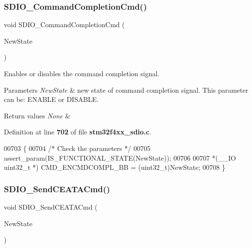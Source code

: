 \subsubsection{S\+D\+I\+O\+\_\+\+Command\+Completion\+Cmd()}
{\footnotesize\ttfamily void S\+D\+I\+O\+\_\+\+Command\+Completion\+Cmd (\begin{DoxyParamCaption}\item[{\textbf{ Functional\+State}}]{New\+State }\end{DoxyParamCaption})}



Enables or disables the command completion signal. 


\begin{DoxyParams}{Parameters}
{\em New\+State} & new state of command completion signal. This parameter can be\+: E\+N\+A\+B\+LE or D\+I\+S\+A\+B\+LE. \\
\hline
\end{DoxyParams}

\begin{DoxyRetVals}{Return values}
{\em None} & \\
\hline
\end{DoxyRetVals}


Definition at line \textbf{ 702} of file \textbf{ stm32f4xx\+\_\+sdio.\+c}.


\begin{DoxyCode}
00703 \{ 
00704   \textcolor{comment}{/* Check the parameters */}
00705   assert_param(IS_FUNCTIONAL_STATE(NewState));
00706   
00707   *(\_\_IO uint32\_t *) CMD_ENCMDCOMPL_BB = (uint32\_t)NewState;
00708 \}
\end{DoxyCode}
\mbox{\label{group__SDIO__Group5_ga8dc7f17804bdb745b42f6647c8487b4c}} 
\subsubsection{S\+D\+I\+O\+\_\+\+Send\+C\+E\+A\+T\+A\+Cmd()}
{\footnotesize\ttfamily void S\+D\+I\+O\+\_\+\+Send\+C\+E\+A\+T\+A\+Cmd (\begin{DoxyParamCaption}\item[{\textbf{ Functional\+State}}]{New\+State }\end{DoxyParamCaption})}



